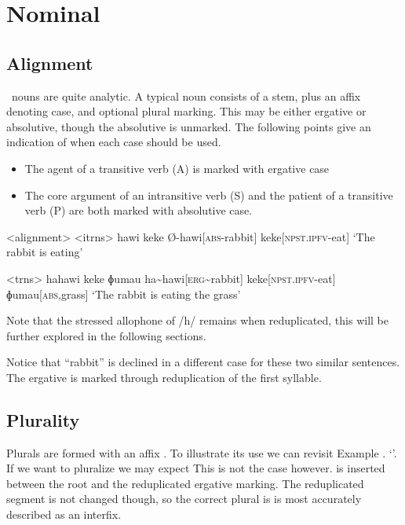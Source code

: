\chapter{Nominal}
\section{Alignment}

\langname\ nouns are quite analytic. A typical noun consists of a stem, plus an affix denoting case, and optional plural marking. This may be either ergative or absolutive, though the absolutive is unmarked. The following points give an indication of when each case should be used.
\begin{itemize}
  \item The agent of a transitive verb (A) is marked with ergative case
  \item The core argument of an intransitive verb (S) and the patient of a transitive verb (P) are both marked with absolutive case.
\end{itemize}

\pex<alignment>
\a<itrns>
\begingl
\glpreamble hawi keke
\endpreamble
Ø-hawi[\textsc{abs-}rabbit]
keke[\textsc{npst.ipfv-}eat]
\glft `The rabbit is eating'
\endgl

\a<trns>
\begingl
\glpreamble hahawi keke ɸumau
\endpreamble
ha\textasciitilde hawi[\textsc{erg\textasciitilde}rabbit]
keke[\textsc{npst.ipfv-}eat]
ɸumau[\textsc{abs,}grass]
\glft `The rabbit is eating the grass'
\endgl
\xe

Note that the stressed allophone of /h/ remains when reduplicated, this will be further explored in the following sections.

Notice that ``rabbit'' is declined in a different case for these two similar sentences. The ergative is marked through reduplication of the first syllable.

\section{Plurality}

Plurals are formed with an affix . To illustrate its use we can revisit Example . `'. If we want to pluralize  we may expect  This is not the case however.  is inserted between the root and the reduplicated ergative marking. The reduplicated segment is not changed though, so the correct plural is   is most accurately described as an interfix.

